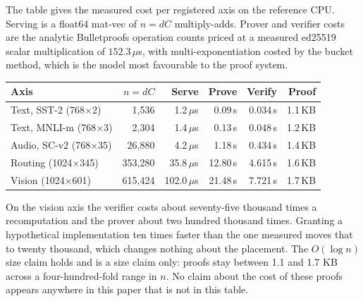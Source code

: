 \documentclass[11pt]{article}
\begin{document}
The table gives the measured cost per registered axis on the
reference CPU. Serving is a float64 mat-vec of $n = dC$ multiply-adds. Prover and
verifier costs are the analytic Bulletproofs operation counts
priced at a measured ed25519 scalar multiplication of
$152.3\,\mu$s, with multi-exponentiation costed by the bucket
method, which is the model most favourable to the proof system.

\begin{center}\small
    \begin{tabular}{lrrrrr}
        \toprule
        Axis                         & $n = dC$  & Serve         & Prove    & Verify   & Proof   \\
        \midrule
        Text, SST-2 (768$\times$2)   & 1{,}536   & 1.2\,$\mu$s   & 0.09\,s  & 0.034\,s & 1.1\,KB \\
        Text, MNLI-m (768$\times$3)  & 2{,}304   & 1.4\,$\mu$s   & 0.13\,s  & 0.048\,s & 1.2\,KB \\
        Audio, SC-v2 (768$\times$35) & 26{,}880  & 4.2\,$\mu$s   & 1.18\,s  & 0.434\,s & 1.4\,KB \\
        Routing (1024$\times$345)    & 353{,}280 & 35.8\,$\mu$s  & 12.80\,s & 4.615\,s & 1.6\,KB \\
        Vision (1024$\times$601)     & 615{,}424 & 102.0\,$\mu$s & 21.48\,s & 7.721\,s & 1.7\,KB \\
        \bottomrule
    \end{tabular}
\end{center}

On the vision axis the verifier costs about seventy-five thousand
times a recomputation and the prover about two hundred thousand
times. Granting a hypothetical implementation ten times faster
than the one measured moves that to twenty thousand, which changes
nothing about the placement. The $O(\log n)$ size claim holds and
is a size claim only: proofs stay between 1.1 and 1.7 KB across a
four-hundred-fold range in $n$. No claim about the cost of these
proofs appears anywhere in this paper that is not in this table.
\end{document}
